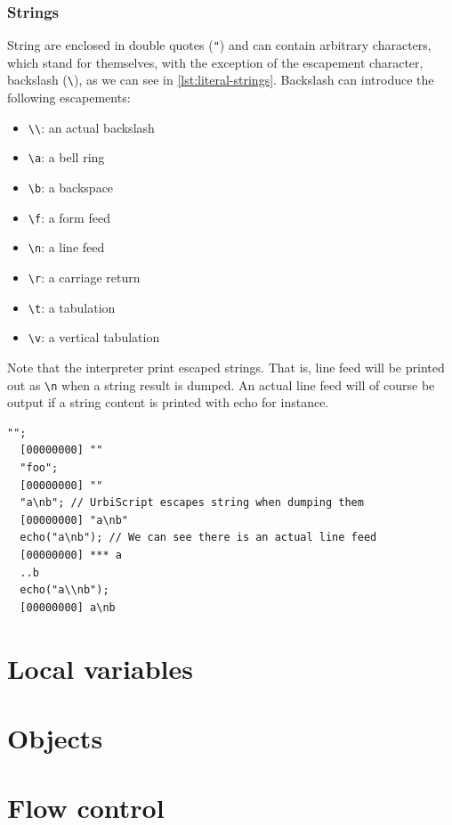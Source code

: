 \documentclass[openright,twoside,12pt]{report}
\newcommand{\lst}[1]{\autoref{lst:#1}}
\begin{document}
\subsubsection{Strings}

String are enclosed in double quotes (\lstinline|"|) and can contain
arbitrary characters, which stand for themselves, with the exception
of the escapement character, backslash (\lstinline|\|), as we can see
in \lst{literal-strings}. Backslash can introduce the following escapements:

\begin{itemize}
  \item \lstinline |\\|: an actual backslash
  \item \lstinline|\a|: a bell ring
  \item \lstinline|\b|: a backspace
  \item \lstinline|\f|: a form feed
  \item \lstinline|\n|: a line feed
  \item \lstinline|\r|: a carriage return
  \item \lstinline|\t|: a tabulation
  \item \lstinline|\v|: a vertical tabulation
\end{itemize}

Note that the interpreter print escaped strings. That is, line feed
will be printed out as \lstinline|\n| when a string result is
dumped. An actual line feed will of course be output if a string
content is printed with echo for instance.

\begin{lstlisting}[caption=Literal strings,label=lst:literal-strings,float=htp]
  "";
  [00000000] ""
  "foo";
  [00000000] ""
  "a\nb"; // UrbiScript escapes string when dumping them
  [00000000] "a\nb"
  echo("a\nb"); // We can see there is an actual line feed
  [00000000] *** a
  ..b
  echo("a\\nb");
  [00000000] a\nb
\end{lstlisting}

\section{Local variables}
\section{Objects}
\section{Flow control}
\end{document}
